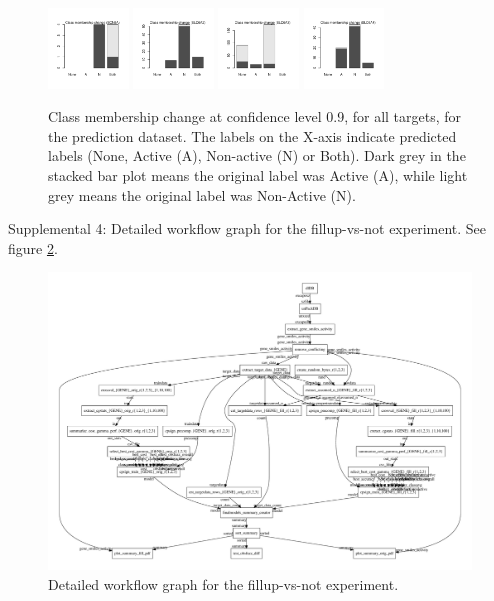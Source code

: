 \documentclass[10pt,article]{memoir}
\begin{document}
\begin{figure}[h!]
\includegraphics[width=0.19\textwidth]{figures/validation_plots/scn5a_0p9_valplot.pdf}
\includegraphics[width=0.19\textwidth]{figures/validation_plots/slc6a2_0p9_valplot.pdf}
\includegraphics[width=0.19\textwidth]{figures/validation_plots/slc6a3_0p9_valplot.pdf}
\includegraphics[width=0.19\textwidth]{figures/validation_plots/slc6a4_0p9_valplot.pdf}
    \caption{Class membership change at confidence level 0.9, for all targets,
    for the prediction dataset.
    The labels on the X-axis indicate predicted labels (None, Active (A),
    Non-active (N) or Both). Dark grey in the stacked bar plot means the
    original label was Active (A), while light grey means the original label
    was Non-Active (N).
    }
    \label{fig:validation_plots_all_0.9}
\end{figure}

Supplemental 4: Detailed workflow graph for the fillup-vs-not experiment. See figure \ref{fig:workflow_detailed_fillup_vs_not}.

\begin{figure}[h!]
\includegraphics[width=\textwidth]{figures/workflow_graph_fillup_vs_not.pdf}
    \caption{Detailed workflow graph for the fillup-vs-not experiment.}
    \label{fig:workflow_detailed_fillup_vs_not}
\end{figure}
\end{document}
